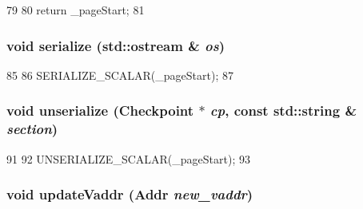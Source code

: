 \begin{DoxyCode}
79     {
80         return _pageStart;
81     }
\end{DoxyCode}
\hypertarget{structPowerISA_1_1TlbEntry_a53e036786d17361be4c7320d39c99b84}{
\subsubsection[{serialize}]{\setlength{\rightskip}{0pt plus 5cm}void serialize (std::ostream \& {\em os})}}
\label{structPowerISA_1_1TlbEntry_a53e036786d17361be4c7320d39c99b84}



\begin{DoxyCode}
85     {
86         SERIALIZE_SCALAR(_pageStart);
87     }
\end{DoxyCode}
\hypertarget{structPowerISA_1_1TlbEntry_af22e5d6d660b97db37003ac61ac4ee49}{
\subsubsection[{unserialize}]{\setlength{\rightskip}{0pt plus 5cm}void unserialize ({\bf Checkpoint} $\ast$ {\em cp}, \/  const std::string \& {\em section})}}
\label{structPowerISA_1_1TlbEntry_af22e5d6d660b97db37003ac61ac4ee49}



\begin{DoxyCode}
91     {
92         UNSERIALIZE_SCALAR(_pageStart);
93     }
\end{DoxyCode}
\hypertarget{structPowerISA_1_1TlbEntry_a5b72666b92ee0adbe9a7d218a0343754}{
\subsubsection[{updateVaddr}]{\setlength{\rightskip}{0pt plus 5cm}void updateVaddr ({\bf Addr} {\em new\_\-vaddr})}}
\label{structPowerISA_1_1TlbEntry_a5b72666b92ee0adbe9a7d218a0343754}



